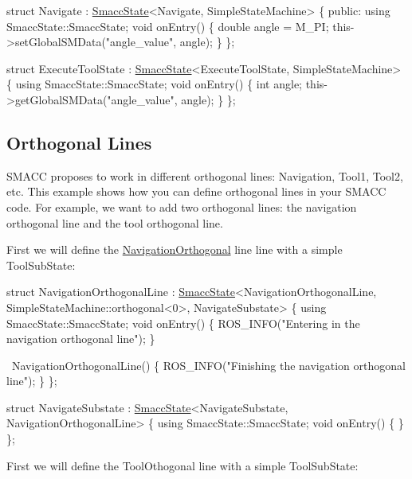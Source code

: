 \begin{DoxyCode}
\textcolor{keyword}{struct }Navigate : \hyperlink{classSmaccState}{SmaccState}<Navigate, SimpleStateMachine>
\{
\textcolor{keyword}{public}:
  \textcolor{keyword}{using} SmaccState::SmaccState;
  \textcolor{keywordtype}{void} onEntry()
  \{
        \textcolor{keywordtype}{double} angle = M\_PI;
        this->setGlobalSMData(\textcolor{stringliteral}{"angle\_value"}, angle);
  \}
\};

\textcolor{keyword}{struct }ExecuteToolState : \hyperlink{classSmaccState}{SmaccState}<ExecuteToolState, SimpleStateMachine>
\{
    \textcolor{keyword}{using} SmaccState::SmaccState;
    \textcolor{keywordtype}{void} onEntry()
    \{
         \textcolor{keywordtype}{int} angle;
         this->getGlobalSMData(\textcolor{stringliteral}{"angle\_value"}, angle);
    \}
\};
\end{DoxyCode}


\subsection*{Orthogonal Lines}

S\+M\+A\+CC proposes to work in different orthogonal lines\+: Navigation, Tool1, Tool2, etc. This example shows how you can define orthogonal lines in your S\+M\+A\+CC code. For example, we want to add two orthogonal lines\+: the navigation orthogonal line and the tool orthogonal line.

 

First we will define the \hyperlink{classNavigationOrthogonal}{Navigation\+Orthogonal} line line with a simple Tool\+Sub\+State\+:


\begin{DoxyCode}
\textcolor{keyword}{struct }NavigationOrthogonalLine
    : \hyperlink{classSmaccState}{SmaccState}<NavigationOrthogonalLine, SimpleStateMachine::orthogonal<0>, NavigateSubstate> \{
  \textcolor{keyword}{using} SmaccState::SmaccState;
  \textcolor{keywordtype}{void} onEntry()                 
  \{
    ROS\_INFO(\textcolor{stringliteral}{"Entering in the navigation orthogonal line"});
  \}

  ~NavigationOrthogonalLine() 
  \{
    ROS\_INFO(\textcolor{stringliteral}{"Finishing the navigation orthogonal line"});
  \}
\};

\textcolor{keyword}{struct }NavigateSubstate : \hyperlink{classSmaccState}{SmaccState}<NavigateSubstate, NavigationOrthogonalLine> 
\{
    \textcolor{keyword}{using} SmaccState::SmaccState;
    \textcolor{keywordtype}{void} onEntry()
    \{
    \}
\};
\end{DoxyCode}
 First we will define the Tool\+Othogonal line with a simple Tool\+Sub\+State\+:


